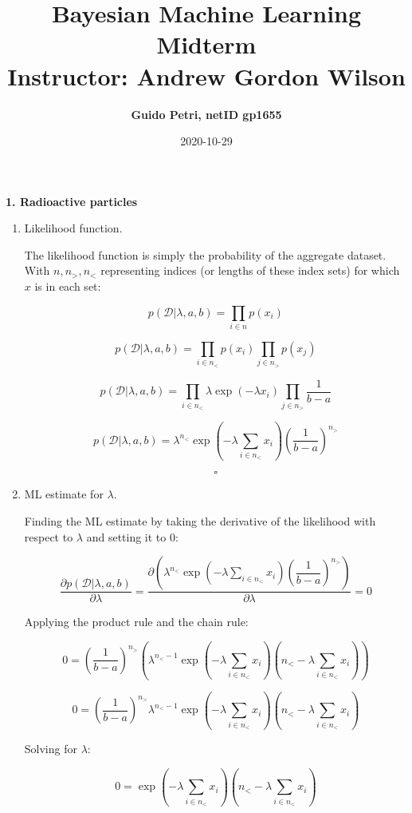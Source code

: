\documentclass[11pt]{article}
\title{\vspace{-20mm} Bayesian Machine Learning Midterm \\ \vspace{5mm}  \normalsize Instructor: Andrew Gordon Wilson}
\date{2020-10-29}
\author{\textbf{Guido Petri, netID gp1655} }
\begin{document}
\maketitle

\textbf{1. Radioactive particles}

\begin{enumerate}[label=\textbf{\alph*.}]
    \item Likelihood function.

        The likelihood function is simply the probability of the aggregate dataset. With $n, n_>, n_<$ representing indices (or lengths of these index sets) for which $x$ is in each set:

        $$
        p(\mathcal{D} | \lambda, a, b) = \prod_{i \in n} p(x_i)
        $$

        $$
        p(\mathcal{D} | \lambda, a, b) = \prod_{i \in n_<} p(x_i) \prod_{j \in n_>} p(x_j)
        $$

        $$
        p(\mathcal{D} | \lambda, a, b) = \prod_{i \in n_<} \lambda \exp (-\lambda x_i) \prod_{j \in n_>} \dfrac{1}{b - a}
        $$

        $$
        p(\mathcal{D} | \lambda, a, b) = \lambda^{n_<} \exp (-\lambda \sum_{i \in n_<} x_i) (\dfrac{1}{b - a})^{n_>}
        $$

        $$\square$$

    \item ML estimate for $\lambda$.

        Finding the ML estimate by taking the derivative of the likelihood with respect to $\lambda$ and setting it to $0$:

        $$
        \dfrac{\partial p(\mathcal{D} | \lambda, a, b)}{\partial \lambda} = \dfrac{\partial (\lambda^{n_<} \exp (-\lambda \sum_{i \in n_<} x_i) (\dfrac{1}{b - a})^{n_>})}{\partial \lambda} = 0
        $$

        Applying the product rule and the chain rule:

        $$
        0 = (\dfrac{1}{b - a})^{n_>} (\lambda^{n_< - 1} \exp (-\lambda \sum_{i \in n_<} x_i) (n_< - \lambda \sum_{i \in n_<} x_i))
        $$

        $$
        0 = (\dfrac{1}{b - a})^{n_>} \lambda^{n_< - 1} \exp (-\lambda \sum_{i \in n_<} x_i) (n_< - \lambda \sum_{i \in n_<} x_i)
        $$

        Solving for $\lambda$:

        $$
        0 = \exp (-\lambda \sum_{i \in n_<} x_i) (n_< - \lambda \sum_{i \in n_<} x_i)
        $$


\end{enumerate}
\end{document}
